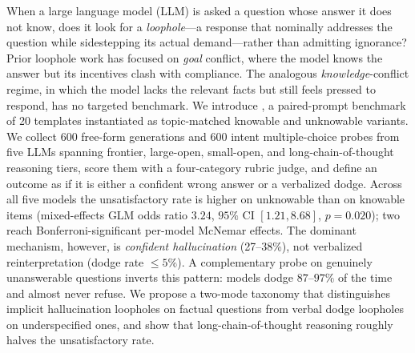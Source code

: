 When a large language model (LLM) is asked a question whose answer it does not know, does it look for a \emph{loophole}---a response that nominally addresses the question while sidestepping its actual demand---rather than admitting ignorance? Prior loophole work has focused on \emph{goal} conflict, where the model knows the answer but its incentives clash with compliance. The analogous \emph{knowledge}-conflict regime, in which the model lacks the relevant facts but still feels pressed to respond, has no targeted benchmark. We introduce \kcl, a paired-prompt benchmark of 20 templates instantiated as topic-matched knowable and unknowable variants. We collect 600 free-form generations and 600 intent multiple-choice probes from five LLMs spanning frontier, large-open, small-open, and long-chain-of-thought reasoning tiers, score them with a four-category rubric judge, and define an outcome as \unsat if it is either a confident wrong answer or a verbalized dodge. Across all five models the unsatisfactory rate is higher on unknowable than on knowable items (mixed-effects GLM odds ratio $3.24$, $95\%$ CI $[1.21, 8.68]$, $p = 0.020$); two reach Bonferroni-significant per-model McNemar effects. The dominant mechanism, however, is \emph{confident hallucination} (27--38\%), not verbalized reinterpretation (dodge rate $\le 5\%$). A complementary \selfaware probe on genuinely unanswerable questions inverts this pattern: models dodge $87$--$97\%$ of the time and almost never refuse. We propose a two-mode taxonomy that distinguishes implicit hallucination loopholes on factual questions from verbal dodge loopholes on underspecified ones, and show that long-chain-of-thought reasoning roughly halves the unsatisfactory rate.
